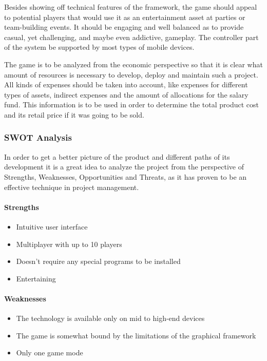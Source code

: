 Besides showing off technical features of the framework, the game should
appeal to potential players that would use it as an entertainment asset at
parties or team-building events. It should be engaging and well balanced as to
provide casual, yet challenging, and maybe even addictive, gameplay. The
controller part of the system be supported by most types of mobile devices.

The game is to be analyzed from the economic perspective so that it is clear
what amount of resources is necessary to develop, deploy and maintain such a
project. All kinds of expenses should be taken into account, like expenses for
different types of assets, indirect expenses and the amount of allocations for
the salary fund. This information is to be used in order to determine the total
product cost and its retail price if it was going to be sold.

\newpage
\subsubsection{SWOT Analysis}

In order to get a better picture of the product and different paths of its
development it is a great idea to analyze the project from the perspective of
Strengths, Weaknesses, Opportunities and Threats, as it has proven to be an
effective technique in project management.

\paragraph{Strengths}

\begin{itemize}
    \item Intuitive user interface
    \item Multiplayer with up to 10 players
    \item Doesn't require any special programs to be installed
    \item Entertaining
\end{itemize}

\paragraph{Weaknesses}

\begin{itemize}
    \item The technology is available only on mid to high-end devices
    \item The game is somewhat bound by the limitations of the graphical framework
    \item Only one game mode
\end{itemize}

